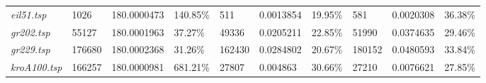 \begin{landscape}
\begin{table}[]
\begin{tabular}{llllllllll}
  \textit{eil51.tsp}                                    & 1026                                   & 180.0000473                                                                          & 140.85\%                                                                               & 511                                    & 0.0013854                                                                             & 19.95\%                                                                                & 581                                    & 0.0020308                                                                            & 36.38\%                                                                                \\
  \textit{gr202.tsp}                                    & 55127                                  & 180.0001963                                                                          & 37.27\%                                                                                & 49336                                  & 0.0205211                                                                             & 22.85\%                                                                                & 51990                                  & 0.0374635                                                                            & 29.46\%                                                                                \\
  \textit{gr229.tsp}                                    & 176680                                 & 180.0002368                                                                          & 31.26\%                                                                                & 162430                                 & 0.0284802                                                                             & 20.67\%                                                                                & 180152                                 & 0.0480593                                                                            & 33.84\%                                                                                \\
  \textit{kroA100.tsp}                                  & 166257                                 & 180.0000981                                                                          & 681.21\%                                                                               & 27807                                  & 0.004863                                                                              & 30.66\%                                                                                & 27210                                  & 0.0076621                                                                            & 27.85\%                                                                                \\

\end{tabular}
\end{table}
\end{landscape}
